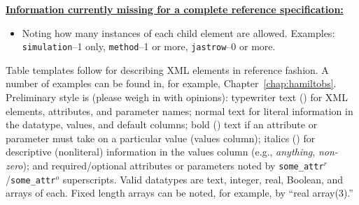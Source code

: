 \textbf{\underline{Information currently missing for a complete reference specification:}}
\begin{itemize}
  \item{Noting how many instances of each child element are allowed.  Examples: \texttt{simulation}--1 only, \texttt{method}--1 or more, \texttt{jastrow}--0 or more}.
\end{itemize}


Table templates follow for describing XML elements in reference fashion.  A number of examples can be found in, for example, Chapter~\ref{chap:hamiltobs}.  Preliminary style is (please weigh in with opinions): typewriter text (\ilatex{\\texttt\{\}}) for XML elements, attributes, and parameter names; normal text for literal information in the datatype, values, and default columns; bold (\ilatex{\\textbf\{\}}) text if an attribute or parameter must take on a particular value (values column); italics (\ilatex{\\textit\{\}}) for descriptive (nonliteral) information in the values column (e.g., \textit{anything}, \textit{non-zero}); and required/optional attributes or parameters noted by \texttt{some\_attr$^r$}/\texttt{some\_attr$^o$} superscripts.  Valid datatypes are text, integer, real, Boolean, and arrays of each.  Fixed length arrays can be noted, for example, by ``real array(3).''


